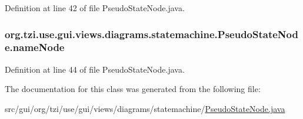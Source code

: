 Definition at line 42 of file Pseudo\-State\-Node.\-java.

\hypertarget{classorg_1_1tzi_1_1use_1_1gui_1_1views_1_1diagrams_1_1statemachine_1_1_pseudo_state_node_af89d34575cb4d7221fe9911361add923}{
\subsubsection[{name\-Node}]{ org.\-tzi.\-use.\-gui.\-views.\-diagrams.\-statemachine.\-Pseudo\-State\-Node.\-name\-Node\hspace{0.3cm}{\ttfamily [protected]}}}\label{classorg_1_1tzi_1_1use_1_1gui_1_1views_1_1diagrams_1_1statemachine_1_1_pseudo_state_node_af89d34575cb4d7221fe9911361add923}


Definition at line 44 of file Pseudo\-State\-Node.\-java.



The documentation for this class was generated from the following file\-:\begin{DoxyCompactItemize}
\item 
src/gui/org/tzi/use/gui/views/diagrams/statemachine/\hyperlink{_pseudo_state_node_8java}{Pseudo\-State\-Node.\-java}\end{DoxyCompactItemize}
